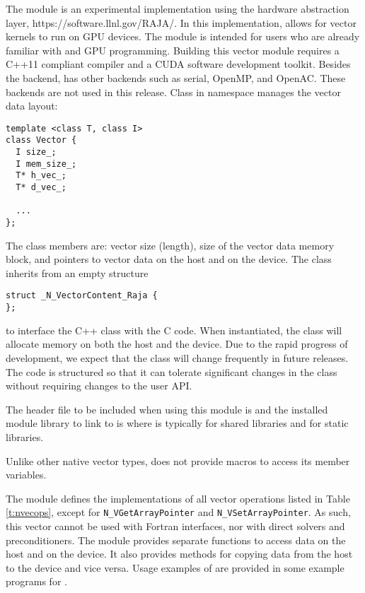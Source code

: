%
The {\nvecraja} module is an experimental {\nvector} implementation using the {\raja} 
hardware abstraction layer, https://software.llnl.gov/RAJA/. In this implementation, {\raja}
allows for {\sundials} vector kernels to run on GPU devices. The module is intended for users 
who are already familiar with {\raja} and GPU programming. Building this vector 
module requires a C++11 compliant compiler and a CUDA software development toolkit. 
Besides the {\cuda} backend, {\raja} has other backends such as serial, OpenMP, 
and OpenAC. These backends are not used in this {\sundials} release.
Class  in namespace  manages the vector data layout:
\begin{verbatim} 
template <class T, class I>
class Vector {
  I size_;
  I mem_size_;
  T* h_vec_;
  T* d_vec_;
  
  ...
};
\end{verbatim}
The class members are: vector size (length), size of the vector data memory block, 
and pointers to vector data on the host and on the device. The class 
inherits from an empty structure
\begin{verbatim} 
struct _N_VectorContent_Raja {
};
\end{verbatim}
to interface the C++ class with the {\nvector} C code. When instantiated, the class
 will allocate memory on both the host and the device. Due to the rapid
progress of {\raja} development, we expect that the 
class will change frequently in future {\sundials} releases. The code is
structured so that it can tolerate significant changes in the 
 class without requiring changes to the user API.


The header file to be included when using this module is 
and the installed module library to link to is
where  is typically  for shared libraries
and  for static libraries.

Unlike other native {\sundials} vector types, {\nvecraja} does not provide macros 
to access its member variables.

The {\nvecraja} module defines the implementations of all vector operations listed 
in Table \ref{t:nvecops}, except for \verb|N_VGetArrayPointer| and 
\verb|N_VSetArrayPointer|. 
As such, this vector cannot be used with {\sundials} Fortran interfaces,
nor with {\sundials} direct solvers and preconditioners. 
The {\nvecraja} module provides separate functions to access data on the host
and on the device. It also provides methods for copying data from the host to 
the device and vice versa. Usage examples of {\nvecraja} are provided in
some example programs for {\cvode} \cite{cvode_ex}.


